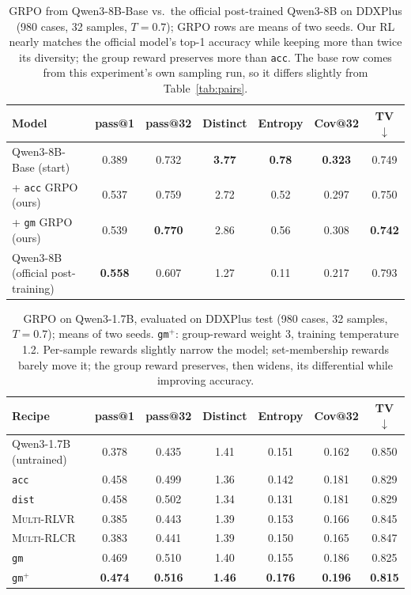 \documentclass[11pt]{article}
\begin{document}
\begin{table}[t]
\centering\small
\begin{tabular}{lcccccc}
\toprule
Model & pass@1 & pass@32 & Distinct & Entropy & Cov@32 & TV$\downarrow$ \\
\midrule
Qwen3-8B-Base (start) & 0.389 & 0.732 & \textbf{3.77} & \textbf{0.78} & \textbf{0.323} & 0.749 \\
\quad + \texttt{acc} GRPO (ours) & 0.537 & 0.759 & 2.72 & 0.52 & 0.297 & 0.750 \\
\quad + \texttt{gm} GRPO (ours) & 0.539 & \textbf{0.770} & 2.86 & 0.56 & 0.308 & \textbf{0.742} \\
Qwen3-8B (official post-training) & \textbf{0.558} & 0.607 & 1.27 & 0.11 & 0.217 & 0.793 \\
\bottomrule
\end{tabular}
\caption{GRPO from Qwen3-8B-Base vs.\ the official post-trained Qwen3-8B on DDXPlus (980 cases, 32 samples, $T{=}0.7$); GRPO rows are means of two seeds. Our RL nearly matches the official model's top-1 accuracy while keeping more than twice its diversity; the group reward preserves more than \texttt{acc}. The base row comes from this experiment's own sampling run, so it differs slightly from Table~\ref{tab:pairs}.}
\label{tab:training8b}
\end{table}

\begin{table}[t]
\centering\small
\begin{tabular}{lcccccc}
\toprule
Recipe & pass@1 & pass@32 & Distinct & Entropy & Cov@32 & TV$\downarrow$ \\
\midrule
Qwen3-1.7B (untrained) & 0.378 & 0.435 & 1.41 & 0.151 & 0.162 & 0.850 \\
\texttt{acc} & 0.458 & 0.499 & 1.36 & 0.142 & 0.181 & 0.829 \\
\texttt{dist} & 0.458 & 0.502 & 1.34 & 0.131 & 0.181 & 0.829 \\
\textsc{Multi-RLVR}~\citep{puri2026beyondmode} & 0.385 & 0.443 & 1.39 & 0.153 & 0.166 & 0.845 \\
\textsc{Multi-RLCR}~\citep{puri2026beyondmode} & 0.383 & 0.441 & 1.39 & 0.150 & 0.165 & 0.847 \\
\texttt{gm} & 0.469 & 0.510 & 1.40 & 0.155 & 0.186 & 0.825 \\
\texttt{gm}$^{+}$ & \textbf{0.474} & \textbf{0.516} & \textbf{1.46} & \textbf{0.176} & \textbf{0.196} & \textbf{0.815} \\
\bottomrule
\end{tabular}
\caption{GRPO on Qwen3-1.7B, evaluated on DDXPlus test (980 cases, 32 samples, $T{=}0.7$); means of two seeds. \texttt{gm}$^{+}$: group-reward weight 3, training temperature 1.2. Per-sample rewards slightly narrow the model; set-membership rewards barely move it; the group reward preserves, then widens, its differential while improving accuracy.}
\label{tab:training}
\end{table}
\end{document}
